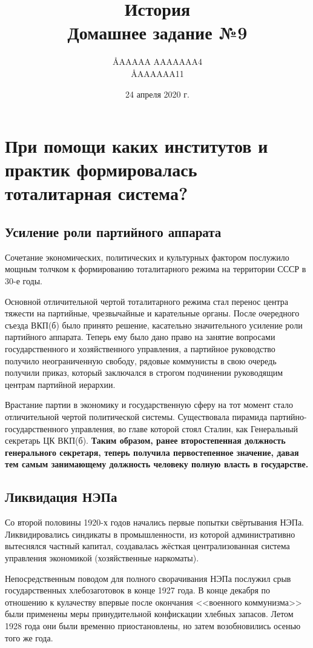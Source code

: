 \documentclass[12pt]{article}
\title{История \\ Домашнее задание №9}
\author{\AA{AAAAA AAAAAAA}{4} \\ \AA{AAAAAA}{11}}
\date{24 апреля 2020 г.}
\begin{document}
  \maketitle

  \setcounter{section}{2}
  \section{При помощи каких институтов и практик формировалась тоталитарная система?}
  \subsection{Усиление роли партийного аппарата}
  Сочетание экономических, политических и культурных фактором послужило мощным толчком к формированию тоталитарного режима на территории СССР в 30-е годы.

  Основной отличительной чертой тоталитарного режима стал перенос центра тяжести на партийные, чрезвычайные и карательные органы.
  После очередного съезда ВКП(б) было принято решение, касательно значительного усиление роли партийного аппарата.
  Теперь ему было дано право на занятие вопросами государственного и хозяйственного управления, а партийное руководство получило неограниченную свободу, рядовые коммунисты в свою очередь получили приказ, который заключался в строгом подчинении руководящим центрам партийной иерархии.

  Врастание партии в экономику и государственную сферу на тот момент стало отличительной чертой политической системы.
  Существовала пирамида партийно-государственного управления, во главе которой стоял Сталин, как Генеральный секретарь ЦК ВКП(б).
  \textbf{Таким образом, ранее второстепенная должность генерального секретаря, теперь получила первостепенное значение,
  давая тем самым занимающему должность человеку полную власть в государстве.}

  \subsection{Ликвидация НЭПа}
  Со второй половины 1920-х годов начались первые попытки свёртывания НЭПа.
  Ликвидировались синдикаты в промышленности, из которой административно вытеснялся частный капитал,
  создавалась жёсткая централизованная система управления экономикой (хозяйственные наркоматы).

  Непосредственным поводом для полного сворачивания НЭПа послужил срыв государственных хлебозаготовок в конце 1927 года.
  В конце декабря по отношению к кулачеству впервые после окончания <<военного коммунизма>> были применены меры принудительной конфискации хлебных запасов.
  Летом 1928 года они были временно приостановлены, но затем возобновились осенью того же года.
\end{document}
